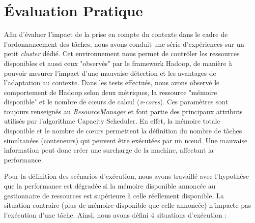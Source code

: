 \section{Évaluation Pratique} \label{sec:exper}

Afin d'évaluer l'impact de la prise en compte du contexte dans le cadre de l'ordonnancement des tâches, nous avons conduit une série d'expériences sur un petit \textit{cluster} dédié. Cet environnement nous permet de contrôler les ressources disponibles et aussi ceux "observés" par le framework Hadoop, de manière à pouvoir mesurer l'impact d'une mauvaise détection et les avantages de l'adaptation au contexte. Dans les tests effectués, nous avons observé le comportement de Hadoop selon deux métriques, la ressource "mémoire disponible" et le nombre de c{\oe}urs de calcul (\textit{v-cores}). Ces paramètres sont toujours renseignés au \textit{ResourceManager} et font partie des principaux attributs utilisés par l'algorithme Capacity Scheduler. En effet, la mémoire totale disponible et le nombre de c{\oe}urs permettent la définition du nombre de tâches simultanées (conteneurs) qui peuvent être exécutées par un n{\oe}ud. Une mauvaise information peut donc créer une surcharge de la machine, affectant la performance.  

Pour la définition des scénarios d'exécution, nous avons travaillé avec l'hypothèse que la performance est dégradée si la mémoire disponible annoncée au gestionnaire de ressources est supérieure à celle réellement disponible. La situation contraire (plus de mémoire disponible que celle annoncée) n'impacte pas l'exécution d'une tâche. Ainsi, nous avons défini 4 situations d'exécution :

